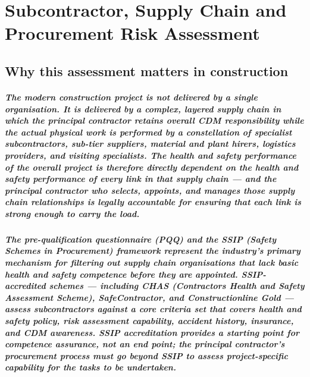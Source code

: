 \chapter{Subcontractor, Supply Chain and Procurement Risk Assessment}
\label{chap:Subcontractor, Supply Chain and Procurement Risk Assessment}

\section{Why this assessment matters in construction}

\paragraph{The modern construction project is not delivered by a single organisation. It is delivered by a complex, layered supply chain in which the principal contractor retains overall CDM responsibility while the actual physical work is performed by a constellation of specialist subcontractors, sub-tier suppliers, material and plant hirers, logistics providers, and visiting specialists. The health and safety performance of the overall project is therefore directly dependent on the health and safety performance of every link in that supply chain --- and the principal contractor who selects, appoints, and manages those supply chain relationships is legally accountable for ensuring that each link is strong enough to carry the load.}

\paragraph{The pre-qualification questionnaire (PQQ) and the SSIP (Safety Schemes in Procurement) framework represent the industry's primary mechanism for filtering out supply chain organisations that lack basic health and safety competence before they are appointed. SSIP-accredited schemes --- including CHAS (Contractors Health and Safety Assessment Scheme), SafeContractor, and Constructionline Gold --- assess subcontractors against a core criteria set that covers health and safety policy, risk assessment capability, accident history, insurance, and CDM awareness. SSIP accreditation provides a starting point for competence assurance, not an end point; the principal contractor's procurement process must go beyond SSIP to assess project-specific capability for the tasks to be undertaken.}

